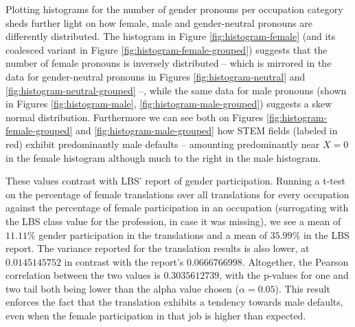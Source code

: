 \documentclass[fleqn,10pt]{article}
\begin{document}
Plotting histograms for the number of gender pronouns per occupation category sheds further light on how female, male and gender-neutral pronouns are differently distributed. The histogram in Figure \ref{fig:histogram-female} (and its coalesced variant in Figure \ref{fig:histogram-female-grouped}) suggests that the number of female pronouns is inversely distributed -- which is mirrored in the data for gender-neutral pronouns in Figures \ref{fig:histogram-neutral} and \ref{fig:histogram-neutral-grouped} --, while the same data for male pronouns (shown in Figures \ref{fig:histogram-male}, \ref{fig:histogram-male-grouped}) suggests a skew normal distribution. Furthermore we can see both on Figures \ref{fig:histogram-female-grouped} and \ref{fig:histogram-male-grouped} how STEM fields (labeled in red) exhibit predominantly male defaults -- amounting predominantly near $X = 0$ in the female histogram although much to the right in the male histogram.

These values contrast with LBS' report of gender participation. Running a t-test on the percentage of female translations over all translations for every occupation against the percentage of female participation in an occupation (surrogating with the LBS class value for the profession, in case it was missing), we see a mean of $11.11\%$ gender participation in the translations and a mean of $35.99\%$ in the LBS report. The variance reported for the translation results is also lower, at $0.0145145752$ in contrast with the report's $0.0666766998$. Altogether, the Pearson correlation between the two values is $0.3035612739$, with the p-values for one and two tail both being lower than the alpha value chosen ($\alpha = 0.05$). This result enforces the fact that the translation exhibits a tendency towards male defaults, even when the female participation in that job is higher than expected.
\end{document}
